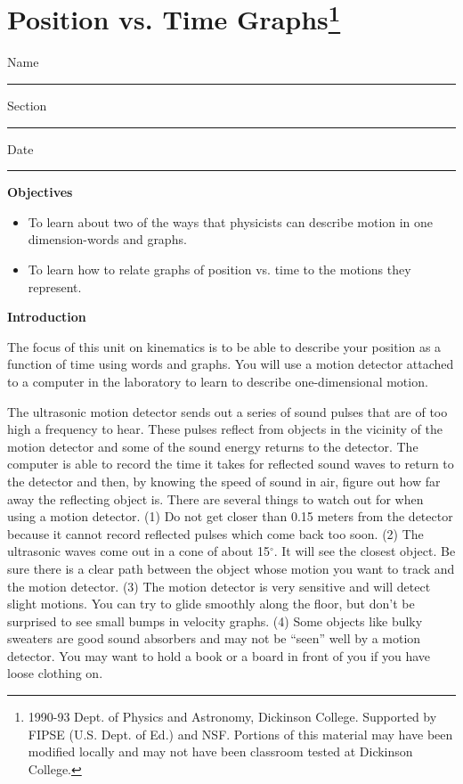 
\section{Position vs. Time Graphs\footnote{
1990-93 Dept. of Physics and Astronomy, Dickinson College. Supported by FIPSE
(U.S. Dept. of Ed.) and NSF. Portions of this material may have been modified
locally and may not have been classroom tested at Dickinson College.
}}

Name \rule{2.0in}{0.1pt}\hfill{}Section \rule{1.0in}{0.1pt}\hfill{}Date \rule{1.0in}{0.1pt}

\textbf{Objectives} 

\begin{itemize}
\item To learn about two of the ways that physicists can describe motion in one dimension-words
and graphs. 
\item To learn how to relate graphs of position vs. time to the motions they represent.
\end{itemize}
\textbf{Introduction} 

The focus of this unit on kinematics is to be able to describe your position
as a function of time using words and graphs. You will use a motion detector
attached to a computer in the laboratory to learn to describe one-dimensional
motion.

The ultrasonic motion detector sends out a series of sound pulses that are of
too high a frequency to hear. These pulses reflect from objects in the vicinity
of the motion detector and some of the sound energy returns to the detector.
The computer is able to record the time it takes for reflected sound waves to
return to the detector and then, by knowing the speed of sound in air, figure
out how far away the reflecting object is. There are several things to watch
out for when using a motion detector. (1) Do not get closer than 0.15 meters
from the detector because it cannot record reflected pulses which come back
too soon. (2) The ultrasonic waves come out in a cone of about 15\( ^{\circ } \).
It will see the closest object. Be sure there is a clear path between the object
whose motion you want to track and the motion detector. (3) The motion detector
is very sensitive and will detect slight motions. You can try to glide smoothly
along the floor, but don't be surprised to see small bumps in velocity graphs.
(4) Some objects like bulky sweaters are good sound absorbers and may not be
``seen'' well by a motion detector. You may want to hold a book
or a board in front of you if you have loose clothing on.

